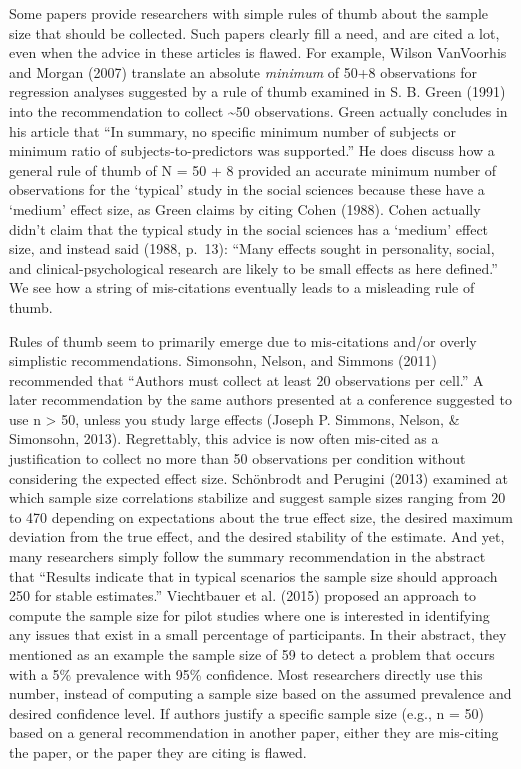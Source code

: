 \documentclass[
  english,
  ,jou, a4paper,floatsintext]{apa6}
\begin{document}
Some papers provide researchers with simple rules of thumb about the sample size that should be collected. Such papers clearly fill a need, and are cited a lot, even when the advice in these articles is flawed. For example, Wilson VanVoorhis and Morgan (2007) translate an absolute \emph{minimum} of 50+8 observations for regression analyses suggested by a rule of thumb examined in S. B. Green (1991) into the recommendation to collect \textasciitilde50 observations. Green actually concludes in his article that ``In summary, no specific minimum number of subjects or minimum ratio of subjects-to-predictors was supported.'' He does discuss how a general rule of thumb of N = 50 + 8 provided an accurate minimum number of observations for the `typical' study in the social sciences because these have a `medium' effect size, as Green claims by citing Cohen (1988). Cohen actually didn't claim that the typical study in the social sciences has a `medium' effect size, and instead said (1988, p.~13): ``Many effects sought in personality, social, and clinical-psychological research are likely to be small effects as here defined.'' We see how a string of mis-citations eventually leads to a misleading rule of thumb.

Rules of thumb seem to primarily emerge due to mis-citations and/or overly simplistic recommendations. Simonsohn, Nelson, and Simmons (2011) recommended that ``Authors must collect at least 20 observations per cell.'' A later recommendation by the same authors presented at a conference suggested to use n \textgreater{} 50, unless you study large effects (Joseph P. Simmons, Nelson, \& Simonsohn, 2013). Regrettably, this advice is now often mis-cited as a justification to collect no more than 50 observations per condition without considering the expected effect size. Schönbrodt and Perugini (2013) examined at which sample size correlations stabilize and suggest sample sizes ranging from 20 to 470 depending on expectations about the true effect size, the desired maximum deviation from the true effect, and the desired stability of the estimate. And yet, many researchers simply follow the summary recommendation in the abstract that ``Results indicate that in typical scenarios the sample size should approach 250 for stable estimates.'' Viechtbauer et al. (2015) proposed an approach to compute the sample size for pilot studies where one is interested in identifying any issues that exist in a small percentage of participants. In their abstract, they mentioned as an example the sample size of 59 to detect a problem that occurs with a 5\% prevalence with 95\% confidence. Most researchers directly use this number, instead of computing a sample size based on the assumed prevalence and desired confidence level. If authors justify a specific sample size (e.g., n = 50) based on a general recommendation in another paper, either they are mis-citing the paper, or the paper they are citing is flawed.
\end{document}
